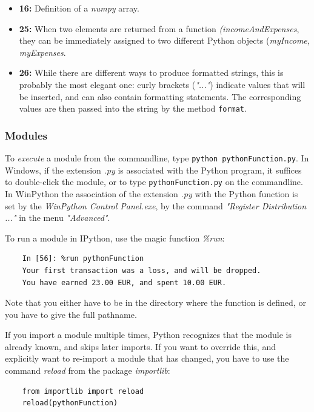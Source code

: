 \begin{itemize}
\begin{itemize}
      \end{itemize}
  \item \textbf{16:} Definition of a \emph{numpy} array.
  \item \textbf{25:} When two elements are returned from a function \emph{(incomeAndExpenses}, they can be immediately assigned to two different Python objects (\emph{myIncome, myExpenses}.
  \item \textbf{26:} While there are different ways to produce formatted strings, this is probably the most elegant one: curly brackets (\emph{"{...}"}) indicate values that will be inserted, and can also contain formatting statements. The corresponding values are then passed into the string by the method \lstinline{format}.
\end{itemize}

\subsubsection{Modules}

To \emph{execute} a module from the commandline, type \lstinline{python pythonFunction.py}. In Windows, if the extension \emph{.py} is associated with the Python program, it suffices to double-click the module, or to type \lstinline{pythonFunction.py} on the commandline. In WinPython the association of the extension \emph{.py} with the Python function is set by the \emph{WinPython Control Panel.exe}, by the command \emph{"Register Distribution ..."} in the menu \emph{"Advanced"}.

To run a module in IPython, use the magic function \emph{\%run}:

\begin{lstlisting}
    In [56]: %run pythonFunction
    Your first transaction was a loss, and will be dropped.
    You have earned 23.00 EUR, and spent 10.00 EUR.
\end{lstlisting}

Note that you either have to be in the directory where the function is defined, or you have to give the full pathname.

If you import a module multiple times, Python recognizes that the module is already known, and skips later imports. If you want to override this, and explicitly want to re-import a module that has changed, you have to use the command \emph{reload} from the package \emph{importlib}:

\begin{lstlisting}
    from importlib import reload
    reload(pythonFunction)
\end{lstlisting}

